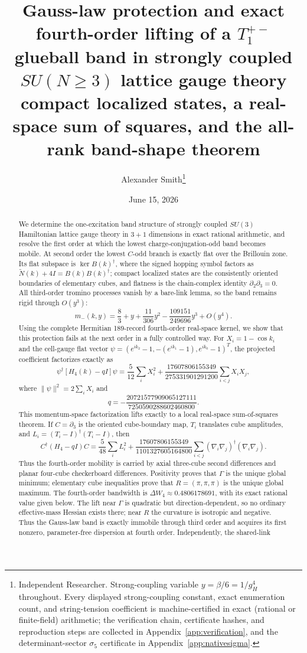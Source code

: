 \documentclass[11pt]{article}
\title{Gauss-law protection and exact fourth-order lifting of a
$T_1^{+-}$ glueball band in strongly coupled $SU(N\geq3)$ lattice gauge theory\\[2pt]
\large compact localized states, a real-space sum of squares,
and the all-rank band-shape theorem}
\author{Alexander Smith\thanks{Independent Researcher.
Strong-coupling variable $y=\beta/6=1/g_H^4$ throughout. Every displayed
strong-coupling constant, exact enumeration count, and string-tension coefficient
is machine-certified in exact (rational or finite-field) arithmetic; the verification
chain, certificate hashes, and reproduction steps are collected in
Appendix~\ref{app:verification}, and the determinant-sector $\sigma_5$ certificate in
Appendix~\ref{app:nativesigma}.}}
\date{June 15, 2026}
\begin{document}
\maketitle

\begin{abstract}
We determine the one-excitation band structure of strongly coupled $SU(3)$
Hamiltonian lattice gauge theory in $3{+}1$ dimensions in exact rational
arithmetic, and resolve the first order at which the lowest
charge-conjugation-odd band becomes mobile. At second order the lowest
$C$-odd branch is exactly flat over the Brillouin zone. Its flat subspace is
$\ker B(k)^\dagger$, where the signed hopping symbol factors as
$\widetilde N(k)+4I=B(k)B(k)^\dagger$; compact localized states are the
consistently oriented boundaries of elementary cubes, and flatness is the
chain-complex identity $\partial_2\partial_3=0$. All third-order tromino
processes vanish by a bare-link lemma, so the band remains rigid through
$O(y^3)$:
\[
m_-(k,y)=\frac83+y+\frac{11}{306}y^2
-\frac{109151}{249696}y^3+O(y^4).
\]
Using the complete Hermitian 189-record fourth-order real-space kernel, we
show that this protection fails at the next order in a fully controlled way.
For $X_i=1-\cos k_i$ and the cell-gauge flat vector
$\psi=(e^{ik_2}-1,-(e^{ik_1}-1),e^{ik_0}-1)^T$, the projected coefficient
factorizes exactly as
\[
\psi^\dagger[H_4(k)-qI]\psi
=\frac5{12}\sum_iX_i^2
+\frac{17607806155349}{275331901291200}
 \sum_{i<j}X_iX_j,
\]
where $\|\psi\|^2=2\sum_iX_i$ and
\[
q=-\frac{20721577909065127111}{7250590288602460800}.
\]
This momentum-space factorization lifts exactly to a local real-space
sum-of-squares theorem. If $C=\partial_3$ is the oriented cube-boundary map,
$T_i$ translates cube amplitudes, and
$L_i=(T_i-I)^\dagger(T_i-I)$, then
\[
C^\dagger(H_4-qI)C
=\frac{5}{48}\sum_iL_i^2
+\frac{17607806155349}{1101327605164800}
 \sum_{i<j}(\nabla_i\nabla_j)^\dagger(\nabla_i\nabla_j).
\]
Thus the fourth-order mobility is carried by axial three-cube second
differences and planar four-cube checkerboard differences. Positivity proves that $\Gamma$ is the unique global minimum; elementary
cube inequalities prove that $R=(\pi,\pi,\pi)$ is the unique global
maximum. The fourth-order bandwidth is $\Delta W_4\approx0.4806178691$,
with its exact rational value given below. The lift near $\Gamma$ is quadratic but
direction-dependent, so no ordinary effective-mass Hessian exists there;
near $R$ the curvature is isotropic and negative. Thus the Gauss-law band is
exactly immobile through third order and acquires its first nonzero,
parameter-free dispersion at fourth order. Independently, the shared-link

\end{abstract}
\end{document}
